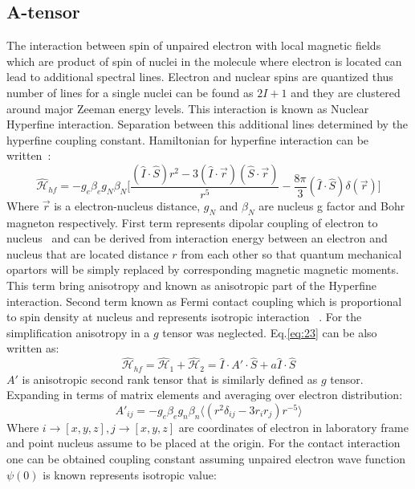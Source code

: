 \subsection{A-tensor}
The interaction between spin of unpaired electron with local magnetic fields which are product of spin of nuclei in the molecule where electron is located can lead to additional spectral lines. Electron and nuclear spins are quantized thus number of lines for a single nuclei can be found as $2I+1$ and they are clustered around major Zeeman energy levels. This interaction is known as Nuclear Hyperfine interaction. Separation between this additional lines determined by the hyperfine coupling constant. Hamiltonian for hyperfine interaction can be written~\cite{nordio}: 
\begin{equation}\label{eq:23}
\mathcal{\hat{H}}_{hf}=-g_e\beta_eg_N\beta_N\Big[\frac{(\hat{I}\cdot \hat{S})r^2-3(\hat{I}\cdot\vec{r})(\hat{S}\cdot\vec{r})}{r^5}-\frac{8\pi}{3}(\hat{I}\cdot\hat{S})\delta(\vec{r})\Big]
\end{equation} 
Where $\vec{r}$ is a electron-nucleus distance, $g_N$ and $\beta_N$ are nucleus g factor and Bohr magneton respectively. First term represents dipolar coupling of electron to nucleus~\cite{car} and can be derived from interaction energy between an electron and nucleus that are located distance $r$ from each other so that quantum mechanical opartors will be simply replaced by corresponding magnetic magnetic moments. This term bring anisotropy and known as anisotropic part of the Hyperfine interaction. Second term known as Fermi contact coupling which is proportional to spin density at nucleus and represents isotropic interaction ~\cite{slich}. For the simplification anisotropy in a $g$ tensor was neglected. Eq.\ref{eq:23} can be also written as: 
\begin{equation}\label{eq:24}
\mathcal{\hat{H}}_{hf}= \mathcal{\hat{H}}_1+\mathcal{\hat{H}}_2=\hat{I}\cdot A'\cdot\hat{S}+a\hat{I}\cdot\hat{S}
\end{equation} 
$A'$ is anisotropic second rank tensor that is similarly defined as $g$ tensor. Expanding in terms of matrix elements and averaging over electron distribution:
\begin{equation}\label{eq:25}
A'_{ij}= -g_e\beta_eg_n\beta_n\langle(r^2\delta_{ij}-3r_ir_j)r^{-5}\rangle
\end{equation} 
Where $i\rightarrow[x,y,z],j\rightarrow[x,y,z]$ are coordinates of electron in laboratory frame and point nucleus assume to be placed at the origin. For the contact interaction one can be obtained coupling constant assuming unpaired electron wave function $\psi(0)$ is known represents isotropic value:
